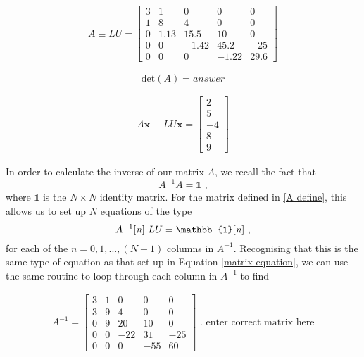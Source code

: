 \documentclass[paper=a4, fontsize=11pt]{scrartcl}
\begin{document}
\begin{align}	
	A \equiv LU =
		\begin{bmatrix}
	3 & 1 & 0 & 0 & 0 \\
	1 & 8 & 4 & 0 & 0 \\
	0 & 1.13 & 15.5 & 10 & 0 \\
	0 & 0 & -1.42 & 45.2 & -25 \\
	0 & 0 & 0 & -1.22 & 29.6
	\end{bmatrix}
\end{align}

\begin{equation}
\text{det}(A) = answer
\end{equation}

\begin{align}
\label{matrix equation}
A \textbf{x} \equiv LU \textbf{x} = 
	\begin{bmatrix}
	2 \\
	5 \\
	-4 \\
	8 \\
	9
	\end{bmatrix}
\end{align}

In order to calculate the inverse of our matrix $A$, we recall the fact that
\begin{equation}
A^{-1} A = \mathbb{1} \text{ ,}
\end{equation}
where $\mathbb{1}$ is the $N \times N$ identity matrix. For the matrix defined in \ref{A define}, this allows us to set up $N$ equations of the type
\begin{equation}
A^{-1}\text{[\textit{n}] } LU = \mathbb{1}\text{[\textit{n}]} \text{ ,}
\end{equation}
for each of the $n = 0, 1, ... , (N-1)$ columns in $A^{-1}$. Recognising that this is the same type of equation as that set up in Equation \ref{matrix equation}, we can use the same routine to loop through each column in $A^{-1}$ to find 

\begin{align}
\label{A define}
A^{-1} = 
\begin{bmatrix}
3 & 1 & 0 & 0 & 0 \\
3 & 9 & 4 & 0 & 0 \\
0 & 9 & 20 & 10 & 0 \\
0 & 0 & -22 & 31 & -25 \\
0 & 0 & 0 & -55 & 60
\end{bmatrix} \text{ . enter correct matrix here}
\end{align}
\end{document}
